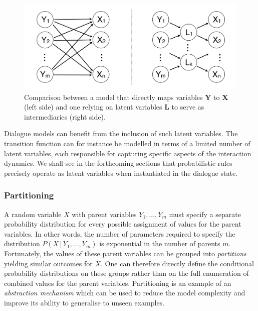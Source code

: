  \begin{figure}[h]
\centering
\includegraphics[scale=0.25]{imgs/latentvariables.pdf}
\caption{Comparison between a model that directly maps variables $\mathbf{Y}$ to $\mathbf{X}$ (left side) and one relying on latent variables $\mathbf{L}$ to serve as intermediaries (right side).}
\label{fig:latentvariables}
\end{figure}

Dialogue models can benefit from the inclusion of such latent variables. The transition function can for instance be modelled in terms of a limited number of latent variables, each responsible for capturing specific aspects of the interaction dynamics.  We shall see in the forthcoming sections that probabilistic rules precisely operate as latent variables when instantiated in the dialogue state. 

\subsubsection*{Partitioning}
A random variable $X$ with parent variables $Y_1,\dots, Y_m$ must specify a separate probability distribution for every possible assignment of values for the parent variables. In other words, the number of parameters required to specify the distribution $P(X \, | \, Y_1, \dots, Y_m)$ is exponential in the number of parents $m$. Fortunately, the values of these parent variables can be grouped into \textit{partitions} yielding similar outcomes for $X$. One can therefore directly define the conditional probability distributions on these groups rather than on the full enumeration of combined values for the parent variables. Partitioning is an example of an \textit{abstraction mechanism} which can be used to reduce the model complexity and improve its ability to generalise to unseen examples. 


